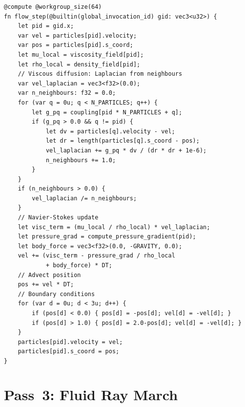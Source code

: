 \documentclass[twocolumn,10pt,a4paper]{article}
\theoremstyle{plain}
\theoremstyle{definition}
\theoremstyle{remark}
\begin{document}
\begin{lstlisting}[style=wgsl,caption={Pass 2: Flow Integration (WGSL)}]
@compute @workgroup_size(64)
fn flow_step(@builtin(global_invocation_id) gid: vec3<u32>) {
    let pid = gid.x;
    var vel = particles[pid].velocity;
    var pos = particles[pid].s_coord;
    let mu_local = viscosity_field[pid];
    let rho_local = density_field[pid];
    // Viscous diffusion: Laplacian from neighbours
    var vel_laplacian = vec3<f32>(0.0);
    var n_neighbours: f32 = 0.0;
    for (var q = 0u; q < N_PARTICLES; q++) {
        let g_pq = coupling[pid * N_PARTICLES + q];
        if (g_pq > 0.0 && q != pid) {
            let dv = particles[q].velocity - vel;
            let dr = length(particles[q].s_coord - pos);
            vel_laplacian += g_pq * dv / (dr * dr + 1e-6);
            n_neighbours += 1.0;
        }
    }
    if (n_neighbours > 0.0) {
        vel_laplacian /= n_neighbours;
    }
    // Navier-Stokes update
    let visc_term = (mu_local / rho_local) * vel_laplacian;
    let pressure_grad = compute_pressure_gradient(pid);
    let body_force = vec3<f32>(0.0, -GRAVITY, 0.0);
    vel += (visc_term - pressure_grad / rho_local
            + body_force) * DT;
    // Advect position
    pos += vel * DT;
    // Boundary conditions
    for (var d = 0u; d < 3u; d++) {
        if (pos[d] < 0.0) { pos[d] = -pos[d]; vel[d] = -vel[d]; }
        if (pos[d] > 1.0) { pos[d] = 2.0-pos[d]; vel[d] = -vel[d]; }
    }
    particles[pid].velocity = vel;
    particles[pid].s_coord = pos;
}
\end{lstlisting}

\section{Pass~3: Fluid Ray March}
\label{sec:pass3}
\end{document}
